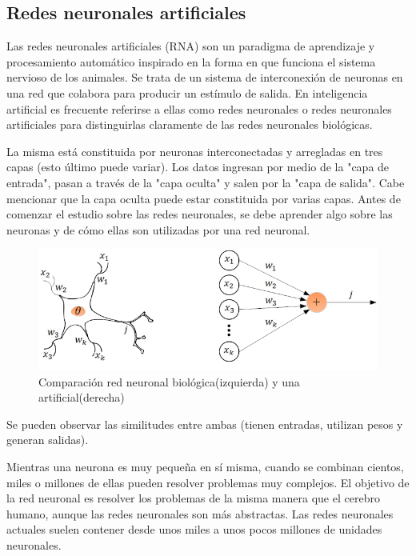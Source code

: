 \subsection{Redes neuronales artificiales}

Las redes neuronales artificiales (RNA) son un paradigma de aprendizaje y procesamiento automático inspirado en la forma en que funciona el sistema nervioso de los animales. Se trata de un sistema de interconexión de neuronas en una red que colabora para producir un estímulo de salida. En inteligencia artificial es frecuente referirse a ellas como redes neuronales o redes neuronales artificiales para distinguirlas claramente de las redes neuronales biológicas.

La misma está constituida por neuronas interconectadas y arregladas en tres capas (esto último puede variar). Los datos ingresan por medio de la "capa de entrada", pasan a través de la "capa oculta" y salen por la "capa de salida". Cabe mencionar que la capa oculta puede estar constituida por varias capas. Antes de comenzar el estudio sobre las redes neuronales, se debe aprender algo sobre las neuronas y de cómo ellas son utilizadas por una red neuronal.

\begin{figure}[h]
    \centering
    \includegraphics[width=.8\textwidth]{images/Figura-7-Neurona-biologica-versus-artificial-Una-neurona-artificial-es-una-unidad-de.png}
    \caption{Comparación red neuronal biológica(izquierda) y una artificial(derecha)}
    \label{fig:neurona_biologica_artificial}
\end{figure}

Se pueden observar las similitudes entre ambas (tienen entradas, utilizan pesos y generan salidas).

Mientras una neurona es muy pequeña en sí misma, cuando se combinan cientos, miles o millones de ellas pueden resolver problemas muy complejos. El objetivo de la red neuronal es resolver los problemas de la misma manera que el cerebro humano, aunque las redes neuronales son más abstractas. Las redes neuronales actuales suelen contener desde unos miles a unos pocos millones de unidades neuronales.

